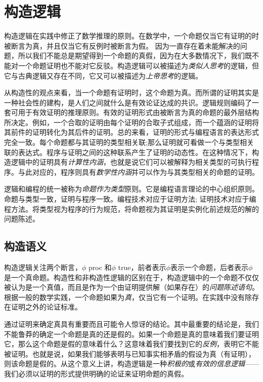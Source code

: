 


%

%

\chapter{构造逻辑}
构造逻辑在实践中修正了数学推理的原则。在数学中，一个命题仅当它有证明的时被断言为真，并且仅当它有反例时被断言为假。 因为一直存在着未能解决的问题，所以我们不能总是期望得到一个命题的真假，因为在大多数情况下，我们既不能对一个命题证明也不能对它反驳。构造逻辑可以被描述为\textit{类似人思考}的逻辑，但它与古典逻辑又存在不同，它又可以被描述为\textit{上帝思考}的逻辑。


从构造性的观点来看，当一个命题有证明时，这个命题为真。而所谓的证明其实是一种社会性的建构，是人们之间就什么是有效论证达成的共识。逻辑规则编码了一套可用于有效证明的推理原则。有效的证明形式由被断言为真的命题的最外层结构所决定。例如，一个合取的证明由每个证明的合取子式组成，而一个蕴涵的证明将其前件的证明转化为其后件的证明。总的来看，证明的形式与编程语言的表达形式完全一致。每个命题都与其证明的类型相关联;那么证明就可看做一个与类型相关联的表达式。程序与证明之间的这种联系产生了证明的动态性。在这种情况下，构造逻辑中的证明具有\textit{计算性内涵}，也就是说它们可以被解释为相关类型的可执行程序。与此对应的，程序则具有\textit{数学性内涵}并可以作为与其类型相关的命题的证明。


逻辑和编程的统一被称为\textit{命题作为类型}原则。它是编程语言理论的中心组织原则。命题与类型一致，证明与程序一致。编程技术对应于证明方法; 证明技术对应于编程方法。将类型视为程序的行为规范，将命题视为其证明是实例化前述规范的解的问题陈述。
\section{构造语义}
构造逻辑关注两个断言，${\phi}$ proc 和${\phi}$ true，前者表示${\phi}$表示一个命题，后者表示${\phi}$是一个真命题。构造性和非构造性逻辑的区别在于，构造逻辑中的一个命题不仅仅被认为是一个真值，而且是作为一个由证明提供解（如果存在）的\textit{问题陈述语句}。根据一般的数学实践，一个命题如果为\textit{真}，仅当它有一个证明。在实践中没有除存在证明之外的论证标准。


通过证明来确定真具有重要而且可能令人惊讶的结论。其中最重要的结论是，我们不能鲁莽的确定一个命题是真的还是假的。如果一个命题是真的意味着我们要证明它，那么这个命题是假的意味着什么？这意味着我们要找到它的\textit{反例}，表明它不能被证明。也就是说，如果我们能够表明与已知事实相矛盾的假设为真（有证明），则该命题是假的。从这个意义上讲，构造逻辑是一种\textit{积极的}或\textit{有效的信息逻辑}——我们必须以证明的形式提供明确的论证来证明命题的真假。


